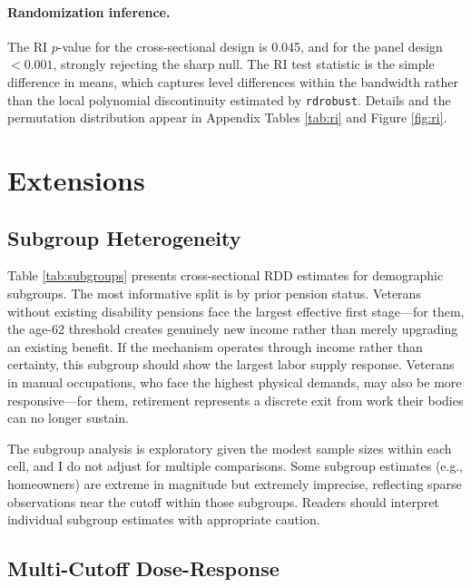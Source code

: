 \documentclass[12pt]{article}
\begin{document}
\paragraph{Randomization inference.} The RI $p$-value for the cross-sectional design is 0.045, and for the panel design $< 0.001$, strongly rejecting the sharp null. The RI test statistic is the simple difference in means, which captures level differences within the bandwidth rather than the local polynomial discontinuity estimated by \texttt{rdrobust}. Details and the permutation distribution appear in Appendix Tables \ref{tab:ri} and Figure \ref{fig:ri}.


\section{Extensions}

\subsection{Subgroup Heterogeneity}

Table \ref{tab:subgroups} presents cross-sectional RDD estimates for demographic subgroups. The most informative split is by prior pension status. Veterans without existing disability pensions face the largest effective first stage---for them, the age-62 threshold creates genuinely new income rather than merely upgrading an existing benefit. If the mechanism operates through income rather than certainty, this subgroup should show the largest labor supply response. Veterans in manual occupations, who face the highest physical demands, may also be more responsive---for them, retirement represents a discrete exit from work their bodies can no longer sustain.



The subgroup analysis is exploratory given the modest sample sizes within each cell, and I do not adjust for multiple comparisons. Some subgroup estimates (e.g., homeowners) are extreme in magnitude but extremely imprecise, reflecting sparse observations near the cutoff within those subgroups. Readers should interpret individual subgroup estimates with appropriate caution.

\subsection{Multi-Cutoff Dose-Response}
\end{document}
